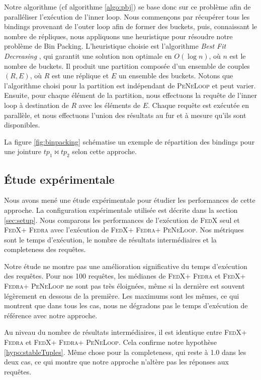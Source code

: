 \documentclass[a4paper]{article}
\def\fedra{\textsc{Fedra}\xspace}
\def\fedx{\textsc{FedX}\xspace}
\def\peneloop{\textsc{PeNeLoop}\xspace}
\begin{document}
Notre algorithme (cf algorithme \ref{algo:pbj}) se base donc sur ce problème afin de paralléliser l'exécution de l'inner loop. Nous commençons par récupérer tous les bindings provenant de l'outer loop afin de former des buckets, puis, connaissant le nombre de répliques, nous appliquons une heuristique pour résoudre notre problème de Bin Packing. L'heuristique choisie est l'algorithme \textit{Best Fit Decreasing} \cite{johnson1973near}, qui garantit une solution non optimale en $O(\log n)$, où $n$ est le nombre de buckets. Il produit une partition composée d'un ensemble de couples $(R, E)$, où $R$ est une réplique et $E$ un ensemble des buckets. Notons que l'algorithme choisi pour la partition est indépendant de \peneloop et peut varier. Ensuite, pour chaque élément de la partition, nous effectuons la requête de l'inner loop à destination de $R$ avec les éléments de $E$. Chaque requête est exécutée en parallèle, et nous effectuons l'union des résultats au fur et à mesure qu'ils sont disponibles.

La figure \ref{fig:binpacking} schématise un exemple de répartition des bindings pour une jointure $tp_1 \bowtie tp_2$ selon cette approche.





\subsection{Étude expérimentale}\label{sec:expPBJ}

Nous avons mené une étude expérimentale pour étudier les performances de cette approche. La configuration expérimentale utilisée est décrite dans la section \ref{sec:setup}. Nous comparons les performances de l'exécution de \fedx seul et \fedx + \fedra avec l'exécution de \fedx + \fedra + \peneloop. Nos métriques sont le temps d'exécution, le nombre de résultats intermédiaires et la completeness des requêtes.

Notre étude ne montre pas une amélioration significative du temps d'exécution des requêtes. Pour nos 100 requêtes, les médianes de \fedx + \fedra et \fedx + \fedra + \peneloop ne sont pas très éloignées, même si la dernière est souvent légèrement en dessous de la première. Les maximums sont les mêmes, ce qui montrent que dans tous les cas, nous ne dégradons pas le temps d'exécution de référence avec notre approche.

Au niveau du nombre de résultats intermédiaires, il est identique entre \fedx + \fedra et \fedx + \fedra + \peneloop. Cela confirme notre hypothèse \ref{hypo:stableTuples}. Même chose pour la completeness, qui reste à 1.0 dans les deux cas, ce qui montre que notre approche n'altère pas les réponses aux requêtes.
\end{document}
